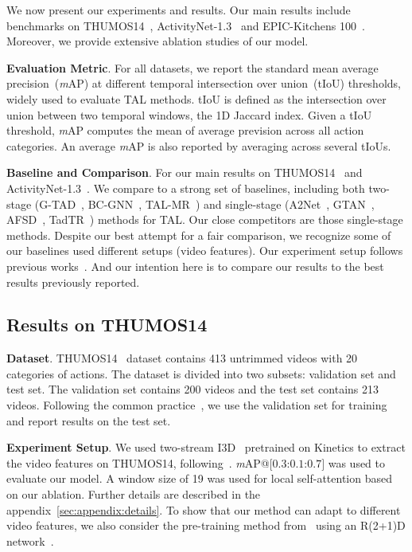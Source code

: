 We now present our experiments and results. Our main results include benchmarks on THUMOS14~\cite{thumoscviu2017}, ActivityNet-1.3~\cite{activitynetcvpr2015} and EPIC-Kitchens 100~\cite{epicarxiv2020}. Moreover, we provide extensive ablation studies of our model.

\smallskip
\noindent \textbf{Evaluation Metric}. For all datasets, we report the standard mean average precision~(\textit{m}AP) at different temporal intersection over union~(tIoU) thresholds, widely used to evaluate TAL methods. tIoU is defined as the intersection over union between two temporal windows, \ie the 1D Jaccard index. Given a tIoU threshold, \textit{m}AP computes the mean of average prevision across all action categories. An average \textit{m}AP is also reported by averaging across several tIoUs.

\smallskip
\noindent \textbf{Baseline and Comparison}. For our main results on THUMOS14~\cite{thumoscviu2017} and ActivityNet-1.3~\cite{activitynetcvpr2015}. We compare to a strong set of baselines, including both two-stage (\eg G-TAD~\cite{gtadcvpr2020}, BC-GNN~\cite{bcgnneccv2020}, TAL-MR~\cite{bottumuptaleccv2020}) and single-stage (\eg A2Net~\cite{a2nettip2020}, GTAN~\cite{gaussiancvpr2019}, AFSD~\cite{afsdcvpr2021}, TadTR~\cite{tadtrarxiv2021}) methods for TAL. Our close competitors are those single-stage methods. Despite our best attempt for a fair comparison, we recognize some of our baselines used different setups (\eg video features). Our experiment setup follows previous works~\cite{cmcscvpr2019,bottumuptaleccv2020}. And our intention here is to compare our results to the best results previously reported.


\subsection{Results on THUMOS14}\label{sec:exp:thumos}

\smallskip
\noindent \textbf{Dataset}.
THUMOS14~\cite{thumoscviu2017} dataset contains 413 untrimmed videos with 20 categories of actions. The dataset is divided into two subsets: validation set and test set. The validation set contains 200 videos and the test set contains 213 videos. Following the common practice~\cite{gtadcvpr2020,bottumuptaleccv2020,bsneccv2018,bmniccv2019}, we use the validation set for training and report results on the test set. 

\smallskip
\noindent \textbf{Experiment Setup}.
We used two-stream I3D~\cite{kinetics2017cvpr} pretrained on Kinetics to extract the video features on THUMOS14, following~\cite{cmcscvpr2019,bottumuptaleccv2020}.
\textit{m}AP@$[0.3$:$0.1$:$0.7]$ was used to evaluate our model. 
A window size of 19 was used for local self-attention based on our ablation. Further details are described in the appendix~\ref{sec:appendix:details}. To show that our method can adapt to different video features, we also consider the pre-training method from~\cite{tspiccvworkshop2021} using an R(2+1)D network~\cite{res2p1d2018cvpr}. %

